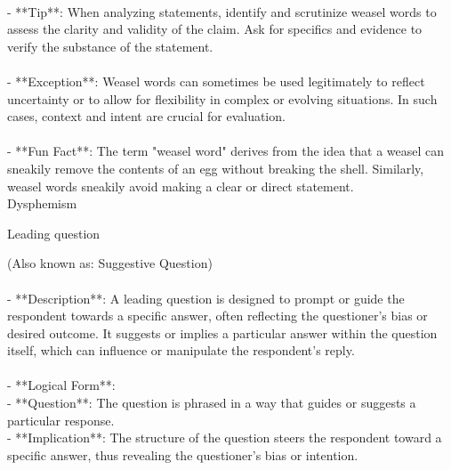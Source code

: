 \documentclass[a4paper,12pt,single,pdftex]{scrartcl}
\begin{document}
    \\

    
      - **Tip**: When analyzing statements, identify and scrutinize weasel words to assess the clarity and validity of the claim. Ask for specifics and evidence to verify the substance of the statement.
    \\

    
      
    \\

    
      - **Exception**: Weasel words can sometimes be used legitimately to reflect uncertainty or to allow for flexibility in complex or evolving situations. In such cases, context and intent are crucial for evaluation.
    \\

    
      
    \\

    
      - **Fun Fact**: The term "weasel word" derives from the idea that a weasel can sneakily remove the contents of an egg without breaking the shell. Similarly, weasel words sneakily avoid making a clear or direct statement.
    \\

  

Dysphemism

Leading question
    
      (Also known as: Suggestive Question)
    \\

  
    
      
    \\

    
      - **Description**: A leading question is designed to prompt or guide the respondent towards a specific answer, often reflecting the questioner's bias or desired outcome. It suggests or implies a particular answer within the question itself, which can influence or manipulate the respondent's reply.
    \\

    
      
    \\

    
      - **Logical Form**:
    \\

    
        - **Question**: The question is phrased in a way that guides or suggests a particular response.
    \\

    
        - **Implication**: The structure of the question steers the respondent toward a specific answer, thus revealing the questioner's bias or intention.
    \\
\end{document}
